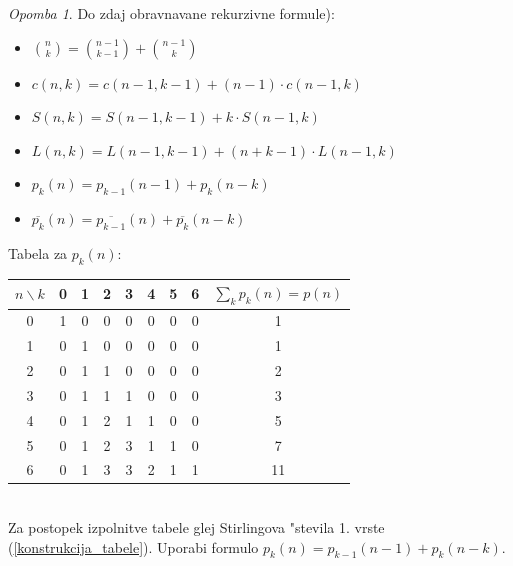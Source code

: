 \documentclass[a4paper,12pt]{article}
\theoremstyle{definition}
\theoremstyle{remark}
\newtheorem*{rem}{Opomba}
\begin{document}
\begin{rem}
	Do zdaj obravnavane rekurzivne formule):\\
	\begin{itemize}
	    \item $\binom{n}{k} = \binom{n - 1}{k - 1} + \binom{n - 1}{k}$
	    \item $c(n, k) = c(n - 1, k - 1) + (n - 1)\cdot c(n - 1, k)$
	    \item $S(n, k) = S(n - 1, k - 1) + k\cdot S(n - 1, k)$
	    \item $L(n, k) = L(n - 1, k - 1) + (n + k - 1)\cdot L(n - 1, k)$
	    \item $p_k(n) = p_{k - 1}(n - 1) + p_k (n - k)$
	    \item $\overline{p_k}(n) = \overline{p_{k - 1}}(n) + \overline{p_k}(n - k)$
	\end{itemize}
\end{rem}

Tabela za $p_k(n)$:
\begin{tabular}{c|c c c c c c c|c}
    $n \backslash k$ & 0 & 1 & 2 & 3 & 4 & 5 & 6 & $\sum_k p_k(n) = p(n)$\\
    \hline
    0 & 1 & 0 & 0 & 0 & 0 & 0 & 0 & 1 \\
    1 & 0 & 1 & 0 & 0 & 0 & 0 & 0 & 1 \\
    2 & 0 & 1 & 1 & 0 & 0 & 0 & 0 & 2 \\
    3 & 0 & 1 & 1 & 1 & 0 & 0 & 0 & 3 \\
    4 & 0 & 1 & 2 & 1 & 1 & 0 & 0 & 5 \\
    5 & 0 & 1 & 2 & 3 & 1 & 1 & 0 & 7 \\
    6 & 0 & 1 & 3 & 3 & 2 & 1 & 1 & 11 \\
\end{tabular}\\
Za postopek izpolnitve tabele glej Stirlingova "stevila 1. vrste (\ref{konstrukcija_tabele}). Uporabi formulo $p_k(n) = p_{k - 1}(n - 1) + p_k(n - k)$.

\label{TODO: why is this commented out}
\end{document}
